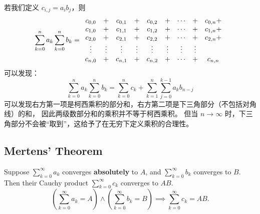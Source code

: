 \documentclass[
	UTF-8,
	11pt, %
	a4paper, %
]{LegrandOrangeBook}
\begin{document}
    \begin{remark}
        若我们定义 $c_{i,j} = a_i b_j$，则
        $$
            \sum_{k=0}^{n} a_k \sum_{k=0}^{n} b_k = 
            \begin{array}{ c c c c c c c c c}
                c_{0,0} &+& c_{0,1} &+& c_{0,2} &+& \cdots &+& c_{0,n} + \\
                c_{1,0} &+& c_{1,1} &+& c_{1,2} &+& \cdots &+& c_{1,n} + \\
                c_{2,0} &+& c_{2,1} &+& c_{2,2} &+& \cdots &+& c_{2,n} + \\
                \vdots & \vdots & \vdots & \vdots & \vdots & \vdots & \vdots & \vdots &\\
                c_{n,0} &+& c_{n,1} &+& c_{n,2} &+& \cdots &+& c_{n,n}  \\
            \end{array} 
        $$
        可以发现：
        $$
            \sum_{k=0}^{n} a_k \sum_{k=0}^{n} b_k 
            = \sum^{n}_{k=0}c_k + \sum^{n}_{k = 1} \sum^{k-1}_{j = 0} a_k b_{n-j}
        $$
        可以发现右方第一项是柯西乘积的部分和，右方第二项是下三角部分（不包括对角线）的和，
        因此两级数部分和的乘积并不等于柯西乘积。
        但当 $n \to \infty$ 时，下三角部分不会被“取到”，这给予了在无穷下定义乘积的合理性。

    \end{remark}

    \subsection{Mertens' Theorem}

    \begin{theorem}
    Suppose $\sum_{k=0}^{\infty} a_k$ converges \textbf{absolutely} to $A$, and $\sum_{k=0}^{\infty} b_k$ converges to $B$. Then their Cauchy product $\sum_{k=0}^{\infty} c_k$ converges to $AB$.
    \[ \left( \sum_{k=0}^{\infty} a_k = A \right) \land \left( \sum_{k=0}^{\infty} b_k = B \right) \implies \sum_{k=0}^{\infty} c_k = AB. \]
    \end{theorem}

\end{document}
